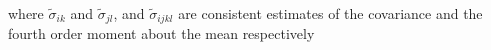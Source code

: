 \noindent where
$\tilde{\sigma}_{ik}$ and $\tilde{\sigma}_{jl}$,
and
$\tilde{\sigma}_{ijkl}$
are consistent
estimates of the covariance
and the fourth order moment about the mean respectively

